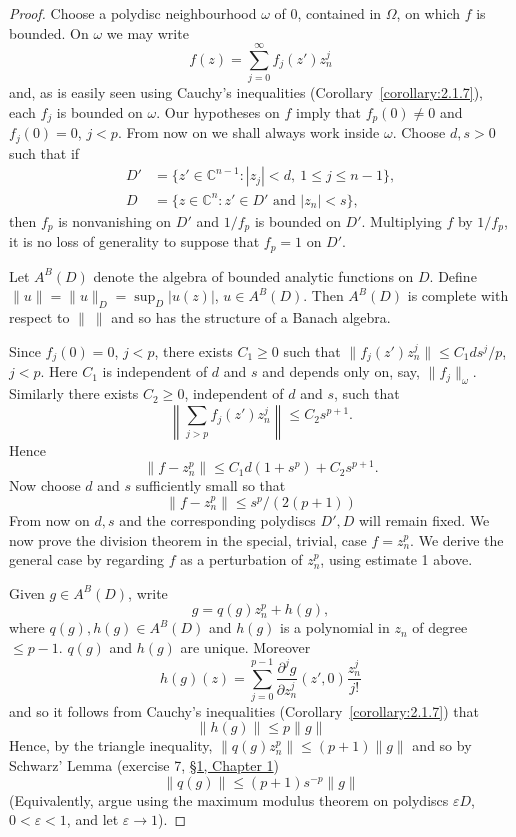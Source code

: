 \begin{proof}
Choose a polydisc neighbourhood $\omega$ of $0$, contained in $\Omega$, on which $f$ is bounded. On $\omega$ we may write
\[f(z)=\sum_{j=0}^\infty f_j(z')z_n^j\]
and, as is easily seen using Cauchy's inequalities (Corollary~\ref{corollary:2.1.7}), each $f_j$ is bounded on $\omega$. Our hypotheses on $f$ imply that $f_p(0)\ne0$ and $f_j(0)=0$, $j<p$. From now on we shall always work inside $\omega$. Choose $d,s>0$ such that if
\begin{align*}
D'&=\{z'\in\mathbb C^{n-1}:|z_j|<d,\ 1\leq j\leq n-1\},\\
D&=\{z\in\mathbb C^n:z'\in D'\text{ and }|z_n|<s\},
\end{align*}
then $f_p$ is nonvanishing on $D'$ and $1/f_p$ is bounded on $D'$. Multiplying $f$ by $1/f_p$, it is no loss of generality to suppose that $f_p=1$ on $D'$.

Let $A^B(D)$ denote the algebra of bounded analytic functions on $D$. Define $\|u\|=\|u\|_D=\sup_D|u(z)|$, $u\in A^B(D)$. Then $A^B(D)$ is complete with respect to $\|\ \|$ and so has the structure of a Banach algebra.

Since $f_j(0)=0$, $j<p$, there exists $C_1\geq0$ such that $\|f_j(z')z_n^j\|\leq C_1ds^j/p$, $j<p$. Here $C_1$ is independent of $d$ and $s$ and depends only on, say, $\|f_j\|_\omega$. Similarly there exists $C_2\geq0$, independent of $d$ and $s$, such that
\[\left\|\sum_{j>p}f_j(z')z_n^j\right\|\leq C_2s^{p+1}.\]
Hence
\[\|f-z_n^p\|\leq C_1d(1+s^p)+C_2s^{p+1}.\]
Now choose $d$ and $s$ sufficiently small so that
\begin{equation}\|f-z_n^p\|\leq s^p/(2(p+1))\tag{1}\label{eq:3:1:1}\end{equation}
From now on $d,s$ and the corresponding polydiscs $D',D$ will remain fixed. We now prove the division theorem in the special, trivial, case $f=z_n^p$. We derive the general case by regarding $f$ as a perturbation of $z_n^p$, using estimate 1 above.

Given $g\in A^B(D)$, write
\[g=q(g)z_n^p+h(g),\]
where $q(g),h(g)\in A^B(D)$ and $h(g)$ is a polynomial in $z_n$ of degree $\leq p-1$. $q(g)$ and $h(g)$ are unique. Moreover
\[h(g)(z)=\sum_{j=0}^{p-1}\frac{\partial^jg}{\partial z_n^j}(z',0)\frac{z_n^j}{j!}\]
and so it follows from Cauchy's inequalities (Corollary~\ref{corollary:2.1.7}) that
\begin{equation}\|h(g)\|\leq p\|g\|\tag{2}\label{eq:3:2:1}\end{equation}
Hence, by the triangle inequality, $\|q(g)z_n^p\|\leq(p+1)\|g\|$ and so by Schwarz' Lemma (exercise 7, \hyperref[sec:1:1]{\S1, Chapter 1})
\begin{equation}\|q(g)\|\leq(p+1)s^{-p}\|g\|\tag{3}\label{eq:3:3:1}\end{equation}
(Equivalently, argue using the maximum modulus theorem on polydiscs $\varepsilon D$, $0<\varepsilon<1$, and let $\varepsilon\to1$).


\end{proof}
